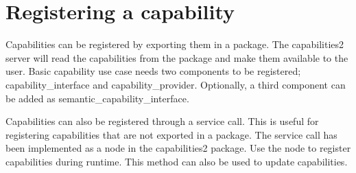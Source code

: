 \chapter{Registering a capability}
\hypertarget{md_capabilities2__server_2docs_2register}{}\label{md_capabilities2__server_2docs_2register}
\label{md_capabilities2__server_2docs_2register_autotoc_md39}%
%
 Capabilities can be registered by exporting them in a package. The capabilities2 server will read the capabilities from the package and make them available to the user. Basic capability use case needs two components to be registered; {\ttfamily capability\+\_\+interface} and {\ttfamily capability\+\_\+provider}. Optionally, a third component can be added as {\ttfamily semantic\+\_\+capability\+\_\+interface}.


\begin{DoxyCode}{0}
\DoxyCodeLine{\textcolor{comment}{<!-\/-\/\ see\ std\_capabilities\ package\ for\ examples\ -\/-\/>}}
\DoxyCodeLine{<\textcolor{keywordtype}{export}>}
\DoxyCodeLine{\ \ \ \ <\textcolor{keywordtype}{capability\_interface}>}
\DoxyCodeLine{\ \ \ \ \ \ \ \ \textcolor{keyword}{interfaces}/\textcolor{keyword}{cool\_cap.yaml}}
\DoxyCodeLine{\ \ \ \ </\textcolor{keywordtype}{capability\_interface}>}
\DoxyCodeLine{\ \ \ \ }
\DoxyCodeLine{\ \ \ \ <\textcolor{keywordtype}{capability\_provider}>}
\DoxyCodeLine{\ \ \ \ \ \ \ \ \textcolor{keyword}{providers}/\textcolor{keyword}{cool\_cap.yaml}}
\DoxyCodeLine{\ \ \ \ </\textcolor{keywordtype}{capability\_provider}>}
\DoxyCodeLine{}
\DoxyCodeLine{\ \ \ \ <\textcolor{keywordtype}{semantic\_capability\_interface}>}
\DoxyCodeLine{\ \ \ \ \ \ \ \ \textcolor{keyword}{semantic\_interfaces}/\textcolor{keyword}{not\_cool\_cap.yaml}}
\DoxyCodeLine{\ \ \ \ </\textcolor{keywordtype}{semantic\_capability\_interface}>}
\DoxyCodeLine{</\textcolor{keywordtype}{export}>}

\end{DoxyCode}


Capabilities can also be registered through a service call. This is useful for registering capabilities that are not exported in a package. The service call has been implemented as a node in the capabilities2 package. Use the node to register capabilities during runtime. This method can also be used to update capabilities. 